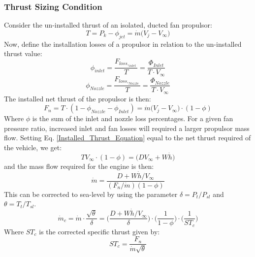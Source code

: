 		\subsubsection{Thrust Sizing Condition}
			Consider the un-installed thrust of an isolated, ducted fan propulsor:
			\begin{equation}
				T = P_k - \phi_{jet} = \dot{m} \Big(V_j - V_\infty\Big)
			\end{equation}
			Now, define the installation losses of a propulsor in relation to the un-installed thrust value:
			\begin{equation}
				\phi_{inlet} = \frac{F_{loss,_{inlet}}}{T} = \frac{\Phi_{Inlet}}{T \cdot V_\infty}
			\end{equation}
			\begin{equation}
				\phi_{Nozzle} = \frac{F_{loss,_{Nozzle}}}{T} = \frac{\Phi_{Nozzle}}{T \cdot V_\infty}
			\end{equation}			
			The installed net thrust of the propulsor is then:
			\begin{equation}
				F_n = T \cdot (1- \phi_{Nozzle} - \phi_{Inlet}) = \dot{m}\Big(V_j - V_\infty\Big) \cdot (1 - \phi)			
				\label{Installed_Thrust_Equation}
			\end{equation}
			Where $\phi$ is the sum of the inlet and nozzle loss percentages.  For a given fan pressure ratio, increased inlet and fan losses will required a larger propulsor mass flow.  Setting Eq. \ref{Installed_Thrust_Equation} equal to the net thrust required of the vehicle, we get:
			\begin{equation}
				TV_\infty \cdot (1 - \phi) = \Big(DV_\infty + W\dot{h})
			\end{equation}
			and the mass flow required for the engine is then:
			\begin{equation}
				\dot{m} = \frac{D + W\dot{h}/{V_\infty}}{(F_n / \dot{m})(1 - \phi)}
				\label{Max_Mass_Flow}
			\end{equation}
			This can be corrected to sea-level by using the parameter $\delta = P_t/P_{sl}$ and $\theta = T_t/T_{sl}$.			
			\begin{equation}
				\dot{m}_c = \dot{m}\cdot \frac{\sqrt{\theta}}{\delta} = \Big(\frac{D + W\dot{h}/V_\infty}{\delta}\Big)
				\cdot \Big(\frac{1}{1-\phi}\Big) \cdot \Big(\frac{1}{ST_c}\Big)
				\label{mdot_required}
			\end{equation}
			Where $ST_c$ is the corrected specific thrust given by:
			\begin{equation}
				ST_c = \frac{F_n}{\dot{m}\sqrt{\theta}}
			\end{equation}
			
